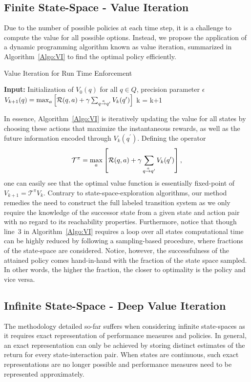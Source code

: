 \subsection{Finite State-Space - Value Iteration}
Due to the number of possible policies at each time step, it is a challenge to compute the value for all possible options. Instead, we propose the application of a dynamic programming algorithm known as value iteration, summarized in Algorithm~\ref{Algo:VI} to find the optimal policy efficiently. 
\begin{algorithm}[h!]
\caption{Value Iteration for Run Time Enforcement}
\label{Algo:VI}
\begin{algorithmic}[1]
\STATE \textbf{Input:} Initialization of $V_{0}(q)$ for all $q\in Q$, precision parameter $\epsilon$
			\STATE $V_{k+1}(q) = \max_{a} \left[\mathcal{R}(q, a) + \gamma \sum_{q \goesto[a]q^{\prime}}V_{k}(q^{\prime})\right]$
		\ENDFOR
	\ENDFOR
		\STATE k = k+1
\ENDWHILE
\end{algorithmic}
\end{algorithm}

In essence, Algorithm~\ref{Algo:VI} is iteratively updating the value for all states by choosing these actions that maximize the instantaneous rewards, as well as the future information encoded through $V_{k}(q^{\prime})$. Defining the operator $$\mathcal{T}^{\pi} = \max_{a} \left[\mathcal{R}(q, a) + \gamma \sum_{q \goesto[a]q^{\prime}}V_{k}(q^{\prime})\right],$$ one can easily see that the optimal value function is essentially  fixed-point of $V_{k+1} = \mathcal{T}^{\pi}  V_{k}$. Contrary to state-space-exploration algorithms, our method remedies the need to construct the full labeled transition system as we only require the knowledge of the successor state from a given state and action pair with no regard to its reachability properties. Furthermore, notice that though line~3 in Algorithm~\ref{Algo:VI} requires a loop over all states computational time can be highly reduced by following a sampling-based procedure, where fractions of the state-space are considered. Notice, however, the successfulness of the attained policy comes hand-in-hand with the fraction of the state space sampled. In other words, the higher the fraction, the closer to optimality is the policy and vice versa. 


\subsection{Infinite State-Space - Deep Value Iteration}
The methodology detailed so-far suffers when considering infinite state-spaces as it requires exact representation of performance measures and policies. In general, an exact representation can only be achieved by storing distinct estimates of the return for every state-interaction pair. When states are continuous, such exact representations are no longer possible and performance measures need to be represented approximately. 


